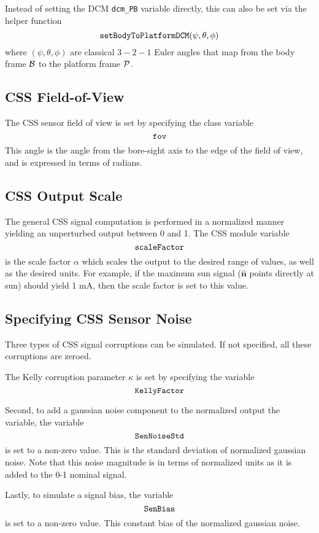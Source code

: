 Instead of setting the DCM {\tt dcm\_PB} variable directly, this can also be set via the helper function
$$
	{\tt setBodyToPlatformDCM}(\psi, \theta, \phi)
$$
where $(\psi, \theta, \phi)$ are classical $3-2-1$ Euler angles that map from the body frame $\cal B$ to the platform frame $\cal P$.  




\subsection{CSS Field-of-View}
The CSS sensor field of view is set by specifying the class variable
$$
	{\tt fov}
$$
This angle is the angle from the bore-sight axis to the edge of the field of view, and is expressed in terms of radians.  





\subsection{CSS Output Scale}
The general CSS signal computation is performed in a normalized manner yielding an unperturbed output between 0 and 1.  The CSS module variable
$$
	{\tt scaleFactor}
$$
is the scale factor $\alpha$ which scales the output to the desired range of values, as well as the desired units.  For example, if the maximum sun signal ($\hat{\bm n}$ points directly at sun) should yield 1 mA, then the scale factor is set to this value.    



\subsection{Specifying CSS Sensor Noise}
Three types of CSS signal corruptions can be simulated.  If not specified, all these corruptions are zeroed.  

The Kelly corruption parameter $\kappa$ is set by specifying the variable
$$
	{\tt KellyFactor}
$$

Second, to add a gaussian noise component to the normalized output the variable, the variable
$$
	{\tt SenNoiseStd}
$$
is set to a non-zero value.  This is the standard deviation of normalized gaussian noise.  Note that this noise magnitude is in terms of normalized units as it is added to the 0-1 nominal signal.  

Lastly, to simulate a signal bias, the variable
$$
	{\tt SenBias}
$$
is set to a non-zero value.   This constant bias of the normalized gaussian noise.  



